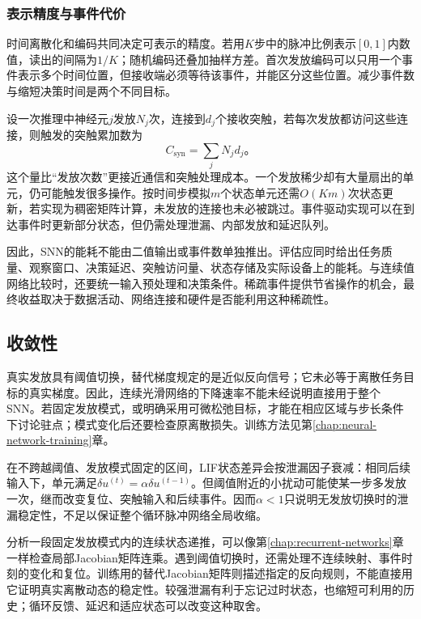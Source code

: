 \subsubsection{表示精度与事件代价}
\label{sec:snn-cost}

时间离散化和编码共同决定可表示的精度。若用$K$步中的脉冲比例表示$[0,1]$内数值，读出的间隔为$1/K$；随机编码还叠加抽样方差。首次发放编码可以只用一个事件表示多个时间位置，但接收端必须等待该事件，并能区分这些位置。减少事件数与缩短决策时间是两个不同目标。

设一次推理中神经元$j$发放$N_j$次，连接到$d_j$个接收突触，若每次发放都访问这些连接，则触发的突触累加数为
\begin{equation}
  C_{\mathrm{syn}}=\sum_jN_jd_j\text{。}
  \label{eq:snn-event-cost}
\end{equation}
这个量比“发放次数”更接近通信和突触处理成本。一个发放稀少却有大量扇出的单元，仍可能触发很多操作。按时间步模拟$m$个状态单元还需$O(Km)$次状态更新，若实现为稠密矩阵计算，未发放的连接也未必被跳过。事件驱动实现可以在到达事件时更新部分状态，但仍需处理泄漏、内部发放和延迟队列。

因此，SNN的能耗不能由二值输出或事件数单独推出。评估应同时给出任务质量、观察窗口、决策延迟、突触访问量、状态存储及实际设备上的能耗。与连续值网络比较时，还要统一输入预处理和决策条件。稀疏事件提供节省操作的机会，最终收益取决于数据活动、网络连接和硬件是否能利用这种稀疏性。

\subsection{收敛性}
\label{sec:snn-convergence}

真实发放具有阈值切换，替代梯度规定的是近似反向信号；它未必等于离散任务目标的真实梯度。因此，连续光滑网络的下降速率不能未经说明直接用于整个SNN。若固定发放模式，或明确采用可微松弛目标，才能在相应区域与步长条件下讨论驻点；模式变化后还要检查原离散损失。训练方法见第\ref{chap:neural-network-training}章。

在不跨越阈值、发放模式固定的区间，LIF状态差异会按泄漏因子衰减：相同后续输入下，单元满足$\delta u^{(t)}=\alpha\delta u^{(t-1)}$。但阈值附近的小扰动可能使某一步多发放一次，继而改变复位、突触输入和后续事件。因而$\alpha<1$只说明无发放切换时的泄漏稳定性，不足以保证整个循环脉冲网络全局收缩。

分析一段固定发放模式内的连续状态递推，可以像第\ref{chap:recurrent-networks}章一样检查局部Jacobian矩阵连乘。遇到阈值切换时，还需处理不连续映射、事件时刻的变化和复位。训练用的替代Jacobian矩阵则描述指定的反向规则，不能直接用它证明真实离散动态的稳定性。较强泄漏有利于忘记过时状态，也缩短可利用的历史；循环反馈、延迟和适应状态可以改变这种取舍。

